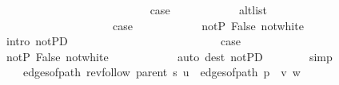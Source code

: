 \begin{isabellebody}
\ \ \ \ \ \ \isamarkupfalse%
\isanewline
\ \ \ \ \ \ \ \ \isamarkupfalse%
\ {}\isanewline
\ \ \ \ \ \ \ \ \isamarkupfalse%
\ {\isacharquery}{\kern0pt}case\isanewline
\ \ \ \ \ \ \ \ \ \ \isamarkupfalse%
\ alt{\isacharunderscore}{\kern0pt}list\isanewline
\ \ \ \ \ \ \ \ \ \ \isacommand{{\isachardot}{\kern0pt}}\isamarkupfalse%
\isanewline
\ \ \ \ \ \ \isamarkupfalse%
\isanewline
\ \ \ \ \ \ \ \ \isamarkupfalse%
\ {}\isanewline
\ \ \ \ \ \ \ \ \isamarkupfalse%
\ {\isacharquery}{\kern0pt}case\isanewline
\ \ \ \ \ \ \ \ \ \ \isamarkupfalse%
\ not{\isacharunderscore}{\kern0pt}P{\isacharprime}{\kern0pt}\ False\ not{\isacharunderscore}{\kern0pt}white\isanewline
\ \ \ \ \ \ \ \ \ \ \isamarkupfalse%
\ {\isacharparenleft}{\kern0pt}intro\ not{\isacharunderscore}{\kern0pt}P{\isacharprime}{\kern0pt}D{\isacharparenleft}{\kern0pt}{}{\isacharparenright}{\kern0pt}{\isacharparenright}{\kern0pt}\isanewline
\ \ \ \ \ \ \isamarkupfalse%
\isanewline
\ \ \ \ \ \ \ \ \isamarkupfalse%
\ {}\isanewline
\ \ \ \ \ \ \ \ \isamarkupfalse%
\ {\isacharquery}{\kern0pt}case\isanewline
\ \ \ \ \ \ \ \ \ \ \isamarkupfalse%
\ not{\isacharunderscore}{\kern0pt}P{\isacharprime}{\kern0pt}\ False\ not{\isacharunderscore}{\kern0pt}white\isanewline
\ \ \ \ \ \ \ \ \ \ \isamarkupfalse%
\ {\isacharparenleft}{\kern0pt}auto\ dest{\isacharcolon}{\kern0pt}\ not{\isacharunderscore}{\kern0pt}P{\isacharprime}{\kern0pt}D{\isacharparenleft}{\kern0pt}{}{\isacharparenright}{\kern0pt}{\isacharparenright}{\kern0pt}\isanewline
\ \ \ \ \ \ \isamarkupfalse%
\ simp\isanewline
\ \ \ \ \isamarkupfalse%
\isanewline
\ \ \isamarkupfalse%
\isanewline
\ \ \isamarkupfalse%
\ \isamarkupfalse%
\isanewline
\ \ \ \ {\isachardoublequoteopen}edges{\isacharunderscore}{\kern0pt}of{\isacharunderscore}{\kern0pt}path\ {\isacharparenleft}{\kern0pt}rev{\isacharunderscore}{\kern0pt}follow\ {\isacharparenleft}{\kern0pt}parent\ s{\isacharparenright}{\kern0pt}\ u{\isacharparenright}{\kern0pt}\ {\isacharat}{\kern0pt}\ edges{\isacharunderscore}{\kern0pt}of{\isacharunderscore}{\kern0pt}path\ {\isacharparenleft}{\kern0pt}p\ {\isacharat}{\kern0pt}\ {\isacharbrackleft}{\kern0pt}v{\isacharcomma}{\kern0pt}\ w{\isacharbrackright}{\kern0pt}{\isacharparenright}{\kern0pt}\ {\isacharequal}{\kern0pt}\isanewline

\end{isabellebody}
